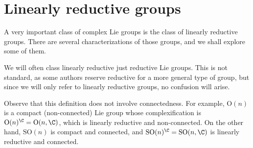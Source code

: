 \section{Linearly reductive groups} \label{appendix_reductive_Lie_groups}
A very important class of complex Lie groups is the class of linearly reductive groups. There are several characterizations of those groups, and we shall explore some of them.


We will often class linearly reductive just reductive Lie groups. This is not standard, as some authors reserve reductive for a more general type of group, but since we will only refer to linearly reductive groups, no confusion will arise.

\begin{obs}
    Observe that this definition does not involve connectedness. For example, \(\mathrm{O}(n)\) is a compact (non-connected) Lie group whose complexification is \(\mathrm{O}(n)^\C=\mathrm{O}(n,\C)\), which is linearly reductive and non-connected. On the other hand, \(\mathrm{SO}(n)\) is compact and connected, and \(\mathrm{SO}(n)^\C=\mathrm{SO}(n,\C)\) is linearly reductive and connected.
\end{obs}





